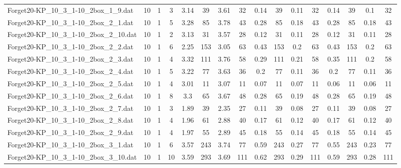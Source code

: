 \begin{sidewaystable}[!ht]
{\begin{tabular}{lccccccccccccccc}
Forget20-KP\_10\_3\_1-10\_2box\_1\_9.dat & 10 & 1 & 3 & 3.14 & 39 & 3.61 & 32 & 0.14 & 39 & 0.11 & 32 & 0.14 & 39 &  \textcolor{blue2}{0.1} & 32 \\
Forget20-KP\_10\_3\_1-10\_2box\_2\_1.dat & 10 & 1 & 5 & 3.28 & 85 & 3.78 & 43 & 0.28 & 85 &  \textcolor{blue2}{0.18} & 43 & 0.28 & 85 &  \textcolor{blue2}{0.18} & 43 \\
Forget20-KP\_10\_3\_1-10\_2box\_2\_10.dat & 10 & 1 & 2 & 3.13 & 31 & 3.57 & 28 & 0.12 & 31 & 0.11 & 28 & 0.12 & 31 & 0.11 & 28 \\
Forget20-KP\_10\_3\_1-10\_2box\_2\_2.dat & 10 & 1 & 6 & 2.25 & 153 & 3.05 & 63 & 0.43 & 153 &  \textcolor{blue2}{0.2} & 63 & 0.43 & 153 &  \textcolor{blue2}{0.2} & 63 \\
Forget20-KP\_10\_3\_1-10\_2box\_2\_3.dat & 10 & 1 & 4 & 3.32 & 111 & 3.76 & 58 & 0.29 & 111 & 0.21 & 58 & 0.35 & 111 &  \textcolor{blue2}{0.2} & 58 \\
Forget20-KP\_10\_3\_1-10\_2box\_2\_4.dat & 10 & 1 & 5 & 3.22 & 77 & 3.63 & 36 & 0.2 & 77 &  \textcolor{blue2}{0.11} & 36 & 0.2 & 77 &  \textcolor{blue2}{0.11} & 36 \\
Forget20-KP\_10\_3\_1-10\_2box\_2\_5.dat & 10 & 1 & 4 & 3.01 & 11 & 3.07 & 11 & 0.07 & 11 & 0.07 & 11 &  \textcolor{blue2}{0.06} & 11 &  \textcolor{blue2}{0.06} & 11 \\
Forget20-KP\_10\_3\_1-10\_2box\_2\_6.dat & 10 & 1 & 8 & 3.3 & 65 & 3.67 & 48 & 0.28 & 65 &  \textcolor{blue2}{0.19} & 48 & 0.28 & 65 &  \textcolor{blue2}{0.19} & 48 \\
Forget20-KP\_10\_3\_1-10\_2box\_2\_7.dat & 10 & 1 & 3 & 1.89 & 39 & 2.35 & 27 & 0.11 & 39 &  \textcolor{blue2}{0.08} & 27 & 0.11 & 39 &  \textcolor{blue2}{0.08} & 27 \\
Forget20-KP\_10\_3\_1-10\_2box\_2\_8.dat & 10 & 1 & 4 & 1.96 & 61 & 2.88 & 40 & 0.17 & 61 &  \textcolor{blue2}{0.12} & 40 & 0.17 & 61 &  \textcolor{blue2}{0.12} & 40 \\
Forget20-KP\_10\_3\_1-10\_2box\_2\_9.dat & 10 & 1 & 4 & 1.97 & 55 & 2.89 & 45 & 0.18 & 55 &  \textcolor{blue2}{0.14} & 45 & 0.18 & 55 &  \textcolor{blue2}{0.14} & 45 \\
Forget20-KP\_10\_3\_1-10\_2box\_3\_1.dat & 10 & 1 & 6 & 3.57 & 243 & 3.74 & 77 & 0.59 & 243 & 0.27 & 77 & 0.55 & 243 &  \textcolor{blue2}{0.23} & 77 \\
Forget20-KP\_10\_3\_1-10\_2box\_3\_10.dat & 10 & 1 & 10 & 3.59 & 293 & 3.69 & 111 & 0.62 & 293 & 0.29 & 111 & 0.59 & 293 &  \textcolor{blue2}{0.28} & 111 \\

\end{tabular}}
\end{sidewaystable}
